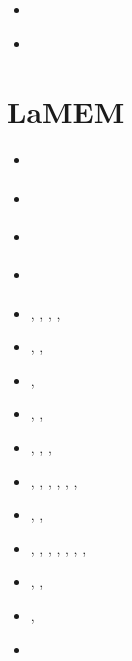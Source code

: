 \begin{small}
\begin{itemize}
\item[\twothousandnineteen] \textcite{demh19}
\item[\twothousandtwentytwo] \textcite{vacd22}
\end{itemize}
\end{small}


\section{LaMEM}

\begin{small}
\begin{itemize}
\item[\twothousandeight]       \textcite{scbe08}
\item[\twothousandten]         \textcite{kamm10}
\item[\twothousandeleven]      \textcite{lemk11}
\item[\twothousandtwelve]      \textcite{may12}
\item[\twothousandfourteen]    \textcite{lesh14},  \textcite{cokm14},  \textcite{bakp14}, 
                               \textcite{feka14a}, \textcite{feka14b}
\item[\twothousandfifteen]     \textcite{puka15},  \textcite{feka15},  \textcite{cofk15}
\item[\twothousandsixteen]     \textcite{kapb16},  \textcite{coyc16}
\item[\twothousandeighteen]    \textcite{pukp18},  \textcite{rekp18},  \textcite{repk18}
\item[\twothousandnineteen]    \textcite{eitp19},  \textcite{hooi19}, 
                               \textcite{pust19},  \textcite{wakz19}
\item[\twothousandtwenty]      \textcite{eitf20},  \textcite{spsk20}, \textcite{pikw20},
                               \textcite{pust20},  \textcite{yakl20}, 
                               \textcite{spbe20},  \textcite{rehp20}
\item[\twothousandtwentyone]   \textcite{suky21},  \textcite{yalw21}, \textcite{waky21}
\item[\twothousandtwentytwo]   \textcite{toyp22},  \textcite{alrr22a}, \textcite{mokj22},
                               \textcite{pusk22},  \textcite{spbk22},  \textcite{lisb22},
                               \textcite{hura22},  \textcite{rokp22}
\item[\twothousandtwentythree] \textcite{gacy23},  \textcite{rida23}, \textcite{yazl23}
\item[\twothousandtwentyfour]  \textcite{durr24},  \textcite{tibi24}
\item[\twothousandtwentyfive]  \textcite{sckl25}
\end{itemize}
\end{small}


